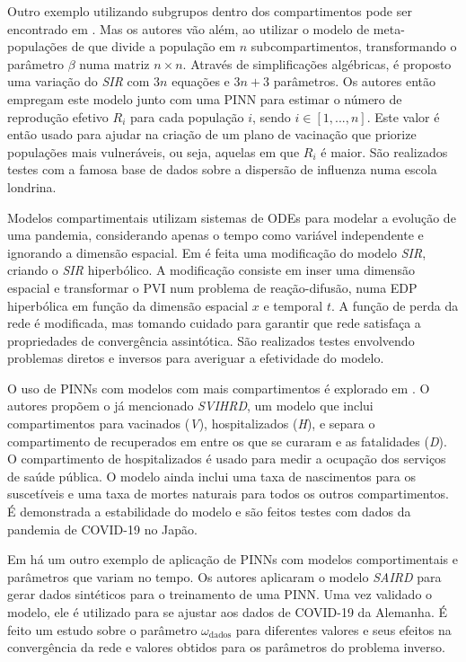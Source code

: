 Outro exemplo utilizando subgrupos dentro dos compartimentos pode ser encontrado
em \cite{arulandu-etal:23-vacinacao}. Mas os autores vão além, ao utilizar 
o modelo de meta-populações de \cite{jacquez:1988-modelagam-hiv-matriz} que 
divide a população em $n$ subcompartimentos, transformando o parâmetro $\beta$ 
numa matriz $n \times n$. Através de simplificações algébricas, é proposto uma 
variação do \textit{SIR} com $3n$ equações e $3n + 3$ parâmetros.
Os autores então empregam este modelo junto com uma PINN para estimar o número 
de reprodução efetivo $R_i$ para cada população $i$, sendo $i \in [1,...,n]$. 
Este valor é então usado para ajudar na criação de um plano de vacinação que 
priorize populações mais vulneráveis, ou seja, aquelas em que $R_i$ é maior.
São realizados testes com a famosa base de dados sobre a dispersão de influenza
numa escola londrina.  

Modelos compartimentais utilizam sistemas de ODEs para modelar a evolução
de uma pandemia, considerando apenas o tempo como variável independente e 
ignorando a dimensão espacial.
Em \cite{bertaglia-etal:22-sir-reacao-difusao} é feita uma modificação do 
modelo \textit{SIR}, criando o \textit{SIR} hiperbólico. 
A modificação consiste em inser uma dimensão espacial e transformar o PVI
num problema de reação-difusão, numa EDP hiperbólica em função da dimensão espacial $x$
e temporal $t$. A função de perda da rede é modificada, mas tomando cuidado
para garantir que rede satisfaça a propriedades de convergência assintótica.
São realizados testes envolvendo problemas diretos e inversos para averiguar
a efetividade do modelo.

O uso de PINNs com modelos com mais compartimentos é explorado em \cite{nelson-etal:24-japao}.
O autores propõem o já mencionado \textit{SVIHRD}, um modelo que inclui 
compartimentos para vacinados (\textit{V}), hospitalizados (\textit{H}), 
e separa o compartimento de recuperados em entre os que se curaram e as 
fatalidades (\textit{D}).
O compartimento de hospitalizados é usado para medir a ocupação dos serviços de
saúde pública.
O modelo ainda inclui uma taxa de nascimentos para os 
suscetíveis e uma taxa de mortes naturais para todos os outros compartimentos.
É demonstrada a estabilidade do modelo e são feitos testes com dados da pandemia 
de COVID-19 no Japão.

Em \cite{han-etal:24-prim-artigo-alemanha} há um outro exemplo de aplicação de
PINNs com modelos comportimentais e parâmetros que variam no tempo. Os autores
aplicaram o modelo \textit{SAIRD} para gerar dados sintéticos para 
o treinamento de uma PINN. Uma vez validado o modelo, ele é utilizado para se
ajustar aos dados de COVID-19 da Alemanha. É feito um estudo sobre o
parâmetro $\omega_{\text{dados}}$ para diferentes valores e seus efeitos na convergência
da rede e valores obtidos para os parâmetros do problema inverso. 

